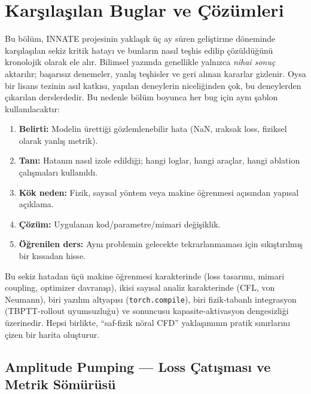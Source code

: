 
\chapter{Karşılaşılan Buglar ve Çözümleri}
\label{ch:buglar}

Bu bölüm, INNATE projesinin yaklaşık üç ay süren geliştirme döneminde karşılaşılan sekiz kritik hatayı ve bunların nasıl teşhis edilip çözüldüğünü kronolojik olarak ele alır. Bilimsel yazımda genellikle yalnızca \textit{nihai sonuç} aktarılır; başarısız denemeler, yanlış teşhisler ve geri alınan kararlar gizlenir. Oysa bir lisans tezinin asıl katkısı, yapılan deneylerin niceliğinden çok, bu deneylerden çıkarılan derslerdedir. Bu nedenle bölüm boyunca her bug için aynı şablon kullanılacaktır:

\begin{enumerate}
    \item \textbf{Belirti:} Modelin ürettiği gözlemlenebilir hata (NaN, ıraksak loss, fiziksel olarak yanlış metrik).
    \item \textbf{Tanı:} Hatanın nasıl izole edildiği; hangi loglar, hangi araçlar, hangi ablation çalışmaları kullanıldı.
    \item \textbf{Kök neden:} Fizik, sayısal yöntem veya makine öğrenmesi açısından yapısal açıklama.
    \item \textbf{Çözüm:} Uygulanan kod/parametre/mimari değişiklik.
    \item \textbf{Öğrenilen ders:} Aynı problemin gelecekte tekrarlanmaması için sıkıştırılmış bir kıssadan hisse.
\end{enumerate}

Bu sekiz hatadan üçü makine öğrenmesi karakterinde (loss tasarımı, mimari coupling, optimizer davranışı), ikisi sayısal analiz karakterinde (CFL, von Neumann), biri yazılım altyapısı (\texttt{torch.compile}), biri fizik-tabanlı integrasyon (TBPTT-rollout uyumsuzluğu) ve sonuncusu kapasite-aktivasyon dengesizliği üzerinedir. Hepsi birlikte, ``saf-fizik nöral CFD'' yaklaşımının pratik sınırlarını çizen bir harita oluşturur.


\section{Amplitude Pumping --- Loss Çatışması ve Metrik Sömürüsü}
\label{sec:bug_amplitude_pumping}

